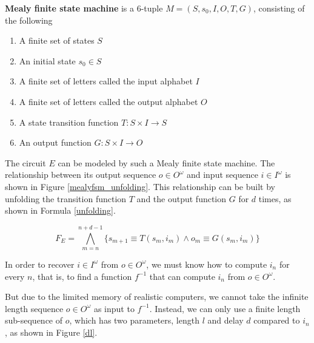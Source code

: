 \documentclass[journal]{IEEEtran}
\begin{document}
\begin{definition11}\label{MealyFSM}%
\textbf{Mealy finite state machine} is a 6-tuple $M=(S,s_0,I,O,T,G)$, consisting of the following
\begin{enumerate}
\item A finite set of states $S$
\item An initial state $s_0\in S$
\item A finite set of letters called the input alphabet $I$
\item A finite set of letters called the output alphabet $O$
\item A state transition function $T: S\times I\to S$
\item An output function $G:S\times I\to O$
\end{enumerate}
\end{definition11}

\vspace{0.2cm}


The circuit $E$ can be modeled by such a Mealy finite state machine.
The relationship between its output sequence $o\in O^{\omega}$ and input sequence $i\in I^{\omega}$ is shown in Figure \ref{mealyfsm_unfolding}.
This relationship can be built by unfolding the transition function $T$ and the output function $G$ for $d$ times,
as shown in Formula \ref{unfolding}.

\begin{equation}\label{unfolding}
F_{E}= \bigwedge_{m=n}^{n+d-1} \Big\{ s_{m+1}\equiv T(s_m,i_m) \wedge  o_m\equiv G(s_m,i_m) \Big\}
\end{equation}

In order to recover $i\in I^{\omega}$ from $o\in O^{\omega}$,
we must know how to compute $i_n$ for every $n$,
that is, to find a function $f^{-1}$ that can compute $i_n$ from $o\in O^{\omega}$.

But due to the limited memory of realistic computers,
we cannot take the infinite length sequence $o\in O^{\omega}$ as input to $f^{-1}$.
Instead,
we can only use a finite length sub-sequence of $o$,
which has two parameters,
length $l$ and delay $d$ compared to $i_n$, as shown in Figure \ref{dl}.
\end{document}
